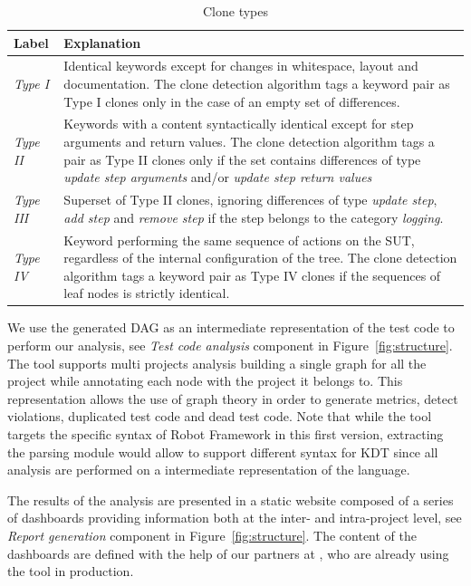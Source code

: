 \begin{table}[!t]
\def\arraystretch{1.0}
\caption{Clone types}
\label{table:clones}
\centering
\begin{tabular}{>{\raggedright}m{0.5in}>{\raggedright}m{4.4in}}
\toprule
\textbf{\scriptsize{Label}} & \textbf{\scriptsize{Explanation}}\tabularnewline
\toprule

\scriptsize{\textit{Type I}} & \scriptsize{Identical keywords except for changes in whitespace, layout and documentation. The clone detection algorithm tags a keyword pair as Type I clones only in the case of an empty set of differences.}
\tabularnewline

\scriptsize{\textit{Type II}} & \scriptsize{Keywords with a content syntactically identical except for step arguments and return values. The clone detection algorithm tags a pair as Type II clones only if the set contains differences of type \emph{update step arguments} and/or \emph{update step return values}}
\tabularnewline

\scriptsize{\textit{Type III}} & \scriptsize{Superset of Type II clones, ignoring differences of type  \emph{update step}, \emph{add step} and \emph{remove step} if the step belongs to the category \emph{logging}.}
\tabularnewline

\scriptsize{\textit{Type IV}} & \scriptsize{Keyword performing the same sequence of actions on the SUT, regardless of the internal configuration of the tree. The clone detection algorithm tags a keyword pair as Type IV clones if the sequences of leaf nodes is strictly identical.}
\tabularnewline

\bottomrule
\end{tabular}
\end{table}
    

We use the generated DAG as an intermediate representation of the test code to perform our analysis, see \emph{Test code analysis} component in Figure~\ref{fig:structure}. The tool supports multi projects analysis building a single graph for all the project while annotating each node with the project it belongs to. This representation allows the use of graph theory in order to generate metrics, detect violations, duplicated test code and dead test code. Note that while the tool targets the specific syntax of Robot Framework in this first version, extracting the parsing module would allow to support different syntax for KDT since all analysis are performed on a intermediate representation of the language.

The results of the analysis are presented in a static website composed of a series of dashboards providing information both at the inter- and intra-project level, see \emph{Report generation} component in Figure~\ref{fig:structure}. The content of the dashboards are defined with the help of our partners at \BGL, who are already using the tool in production.

